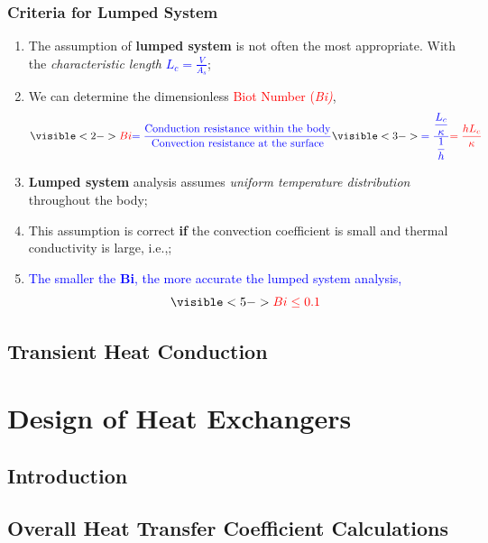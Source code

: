 \documentclass[10pt,compress]{beamer}
\newcommand{\frc}{\displaystyle\frac}
\newcommand{\red}{\textcolor{red}}
\newcommand{\blue}{\textcolor{blue}}
\begin{document}
\begin{frame}
 \frametitle{Criteria for Lumped System}
   \begin{enumerate}%
     \item<1-> The assumption of {\bf lumped system} is not often the most appropriate. With the {\it characteristic length} \blue{$L_{c}=\frc{V}{A_{s}}$};
     \item<2-> We can determine the dimensionless \red{Biot Number (\it{Bi})},
       \begin{equation}
          \visible<2->{\red{Bi} \blue{= \frc{\text{Conduction resistance within the body}}{\text{Convection resistance at the surface}}}} \visible<3->{\blue{= \frc{\frc{L_{c}}{\kappa}}{\frc{1}{h}}} \red{= \frc{h L_{c}}{\kappa}}}
       \end{equation}  
     \item<4-> {\bf Lumped system} analysis assumes {\it uniform temperature distribution} throughout the body;
     \item<4-> This assumption is correct {\bf if} the convection coefficient is small and thermal conductivity is large, i.e.,;
     \item<5-> \blue{The smaller the {\bf Bi}, the more accurate the lumped system analysis,} 
                     \begin{displaymath}
                       \visible<5->{ \red{Bi \leq 0.1}}
                     \end{displaymath}
   \end{enumerate}
\end{frame}



\subsection{Transient Heat Conduction}


\section{Design of Heat Exchangers}

\subsection{Introduction}

\subsection{Overall Heat Transfer Coefficient Calculations}
\end{document}
